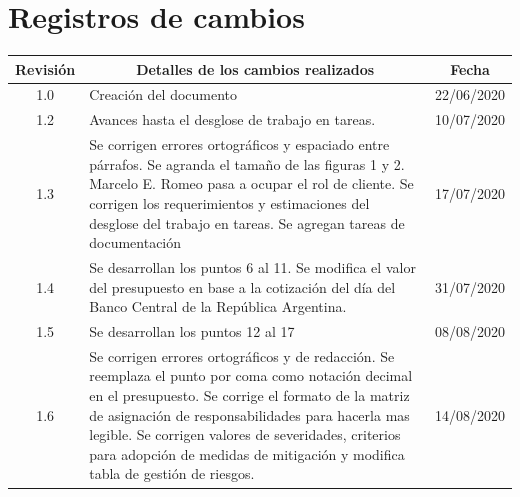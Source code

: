\documentclass[11pt]{charter}
\begin{document}
\maketitle
\thispagestyle{empty}
\pagebreak


\thispagestyle{empty}
{\setlength{\parskip}{0pt}
\tableofcontents{}
}
\pagebreak


\section{Registros de cambios}
\label{sec:registro}


\begin{table}[ht]
\label{tab:registro}
\centering

\begin{tabularx}{\linewidth}{@{}|c|X|c|@{}}
\hline
\rowcolor[HTML]{C0C0C0} 
Revisión & \multicolumn{1}{c|}{\cellcolor[HTML]{C0C0C0}Detalles de los cambios realizados} & Fecha      \\ \hline
1.0      & Creación del documento                                                          & 22/06/2020 \\ \hline
1.2      & Avances hasta el desglose de trabajo en tareas.                                 & 10/07/2020 \\ \hline
1.3      & Se corrigen errores ortográficos y espaciado entre párrafos. \newline
	Se agranda el tamaño de las figuras 1 y 2.\newline
	Marcelo E. Romeo pasa a ocupar el rol de cliente.\newline
	Se corrigen los requerimientos y estimaciones del desglose del trabajo en tareas.\newline
	Se agregan tareas de documentación
& 17/07/2020 \\ \hline

1.4      & Se desarrollan los puntos 6 al 11.\newline
	Se modifica el valor del presupuesto en base a la cotización del día del Banco Central de la República Argentina.\newline
& 31/07/2020 \\ \hline
1.5      & Se desarrollan los puntos 12 al 17                                                  & 08/08/2020 \\ \hline
1.6      & Se corrigen errores ortográficos y de redacción. \newline
	Se reemplaza el punto por coma como notación decimal en el presupuesto.\newline
	Se corrige el formato de la matriz de asignación de responsabilidades para hacerla mas legible.\newline
	Se corrigen valores de severidades, criterios para adopción de medidas de mitigación y modifica tabla de gestión de riesgos.& 14/08/2020 \\ \hline
\end{tabularx}
\end{table}
\end{document}
